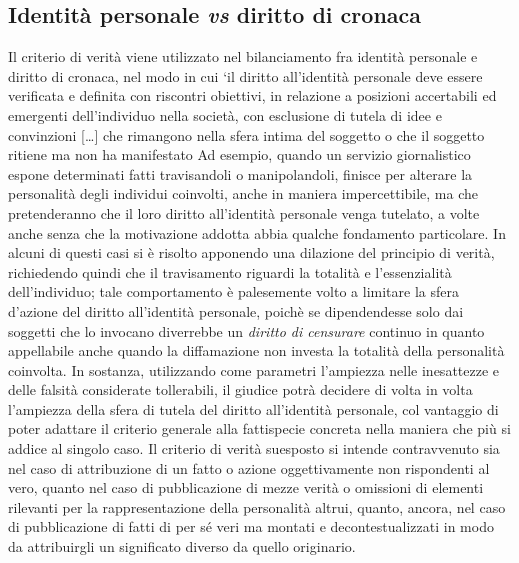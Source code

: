 \subsection{Identità personale \textit{vs} diritto di cronaca}
Il criterio di verità viene utilizzato nel bilanciamento fra identità personale e diritto di cronaca, nel modo in cui ‘il diritto all’identità personale deve essere verificata e definita con riscontri obiettivi, in relazione a posizioni accertabili ed emergenti dell’individuo nella società, con esclusione di tutela di idee e convinzioni […] che rimangono nella sfera intima del soggetto o che il soggetto ritiene ma non ha manifestato
Ad esempio, quando un servizio giornalistico espone determinati fatti travisandoli o manipolandoli, finisce per alterare la personalità degli individui coinvolti, anche in maniera impercettibile, ma che pretenderanno che il loro diritto all'identità personale venga tutelato, a volte anche senza che la motivazione addotta abbia qualche fondamento particolare. In alcuni di questi casi si è risolto apponendo una dilazione del principio di verità, richiedendo quindi che il travisamento riguardi la totalità e l’essenzialità dell'individuo; tale comportamento è palesemente volto a limitare la sfera d’azione del diritto all’identità personale, poichè se dipendendesse solo dai soggetti che lo invocano diverrebbe un \textit{diritto di censurare} continuo in quanto appellabile anche quando la diffamazione non investa la totalità della personalità coinvolta.
In sostanza, utilizzando come parametri l’ampiezza nelle inesattezze e delle falsità considerate tollerabili, il giudice potrà decidere di volta in volta l’ampiezza della sfera di tutela del diritto all’identità personale, col vantaggio di poter adattare il criterio generale alla fattispecie concreta nella maniera che più si addice al singolo caso.
Il criterio di verità suesposto si intende contravvenuto sia nel caso di attribuzione di un fatto o azione oggettivamente non rispondenti al vero, quanto nel caso di pubblicazione di mezze verità o omissioni di elementi rilevanti per la rappresentazione della personalità altrui, quanto, ancora, nel caso di pubblicazione di fatti di per sé veri ma montati e decontestualizzati in modo da attribuirgli un significato diverso da quello originario.
